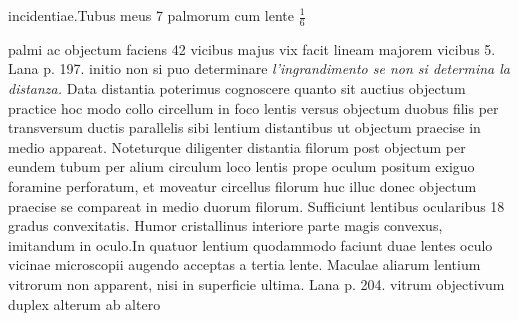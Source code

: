 incidentiae\protect{}.\pend \pstart Tubus meus 7 palmorum cum lente $\displaystyle\frac{1}{6}$\rule[-4mm]{0mm}{10mm} palmi ac  objectum faciens 42 vicibus majus vix facit lineam majorem vicibus 5. \pend \pstart Lana\protect{} p. 197. initio non si puo determinare \textit{l'ingrandimento se non si deter\-mina la distanza.} \pend \pstart Data distantia poterimus cognoscere quanto sit auctius objectum practice hoc modo collo circellum in foco\protect{} lentis\protect{} versus objectum duobus filis per trans\-versum ductis parallelis sibi lentium\protect{} distantibus ut objectum praecise in medio appareat. Noteturque diligenter distantia filorum post  objectum per eundem tubum per alium circulum loco lentis\protect{} prope oculum positum exiguo foramine perforatum, et moveatur circellus filorum huc illuc donec objectum praecise se compareat in medio duorum filorum. Sufficiunt lentibus\protect{} ocularibus\protect{} 18 gradus convexitatis. Humor cristallinus interiore parte magis convexus, imitandum in oculo.\pend \clearpage \pstart In  quatuor lentium\protect{} quodammodo  faciunt duae lentes\protect{} oculo vicinae  microscopii\protect{} augendo  acceptas a tertia lente\protect{}. \pend \pstart Maculae aliarum lentium\protect{} vitrorum non apparent, nisi in superficie ultima. \pend \pstart Lana\protect{} p. 204. vitrum objectivum duplex alterum ab altero 